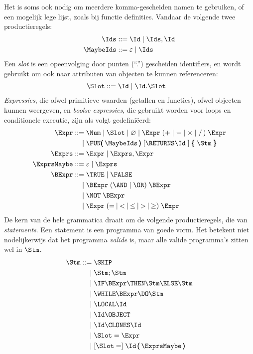 Het is soms ook nodig om meerdere komma-gescheiden namen te gebruiken, of een mogelijk lege lijst, zoals bij functie definities. Vandaar de volgende twee productieregels:
\begin{align*}
  \Ids \GrammarDef \Id \mid \Ids, \Id \\
  \MaybeIds \GrammarDef \varepsilon \mid \Ids
\end{align*}
Een \emph{slot}%
is een opeenvolging door punten (``.'') gescheiden identifiers,%
en wordt gebruikt om ook naar attributen van objecten te kunnen referenceren:%
\begin{align*}
  \Slot \GrammarDef \Id \mid \Id . \Slot
\end{align*}
\emph{Expressies}, die ofwel primitieve waarden (getallen en functies), ofwel objecten kunnen weergeven, en \emph{boolse expressies}, die gebruikt worden voor loops en conditionele executie, zijn als volgt gedefiniëerd:%
\begin{align*}
  \Expr \GrammarDef \Num \mid \Slot \mid \varnothing \mid \Expr\; (+ \mid - \mid \times \mid /\,)\; \Expr \\
  \GrammarOr \FUN\pmb{(}\,\MaybeIds\,\pmb{)}\; \GrammarOpt{\RETURNS \Id\;} \pmb{\{}\; \Stm\; \pmb{\}} \\
  \Exprs \GrammarDef \Expr \mid \Exprs, \Expr \\
  \ExprsMaybe \GrammarDef \varepsilon \mid \Exprs \\
  \BExpr \GrammarDef \TRUE \mid \FALSE \\
  \GrammarOr \BExpr\; (\AND \mid \OR)\; \BExpr \\
  \GrammarOr \NOT\; \BExpr \\
  \GrammarOr \Expr\; (=\: \mid\: <\: \mid\: \le\: \mid\: >\: \mid\: \ge)\; \Expr
\end{align*}
De kern van de hele grammatica draait om de volgende productieregels, die van \emph{statements}. Een statement is een programma van goede vorm. Het betekent niet nodelijkerwijs%
dat het programma \emph{valide} is, maar alle valide programma's zitten wel in $\Stm$.
\begin{align*}
  \Stm \GrammarDef \SKIP \\
  \GrammarOr \Stm; \Stm \\
  \GrammarOr \IF \BExpr \THEN \Stm \ELSE \Stm \\
  \GrammarOr \WHILE \BExpr \DO \Stm \\
  \GrammarOr \LOCAL \Id \\
  \GrammarOr \Id \OBJECT \\
  \GrammarOr \Id \CLONES \Id \\
  \GrammarOr \Slot = \Expr \\
  \GrammarOr \GrammarOpt{\Slot =} \Id\,\pmb{(}\,\ExprsMaybe\,\pmb{)} \\
\end{align*}
